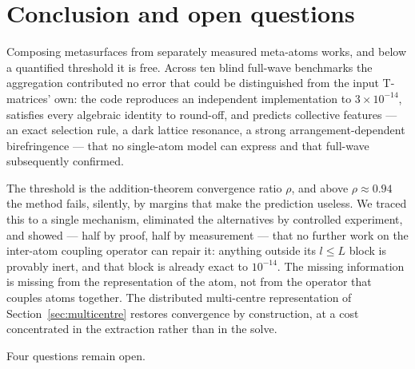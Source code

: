 \documentclass[11pt,a4paper]{article}
\theoremstyle{plain}
\theoremstyle{definition}
\begin{document}
\section{Conclusion and open questions}
\label{sec:open}

Composing metasurfaces from separately measured meta-atoms works, and below a
quantified threshold it is free. Across ten blind full-wave benchmarks the
aggregation contributed no error that could be distinguished from the input
T-matrices' own: the code reproduces an independent implementation to
$3\times10^{-14}$, satisfies every algebraic identity to round-off, and predicts
collective features --- an exact selection rule, a dark lattice resonance, a
strong arrangement-dependent birefringence --- that no single-atom model can
express and that full-wave subsequently confirmed.

The threshold is the addition-theorem convergence ratio $\rho$, and above
$\rho \approx 0.94$ the method fails, silently, by margins that make the
prediction useless. We traced this to a single mechanism, eliminated the
alternatives by controlled experiment, and showed --- half by proof, half by
measurement --- that no further work on the inter-atom coupling operator can
repair it: anything outside its $l \le L$ block is provably inert, and that block
is already exact to $10^{-14}$. The missing information is missing from the
representation of the atom, not from the operator that couples atoms together. The distributed
multi-centre representation of Section~\ref{sec:multicentre} restores convergence
by construction, at a cost concentrated in the extraction rather than in the
solve.

Four questions remain open.
\end{document}
